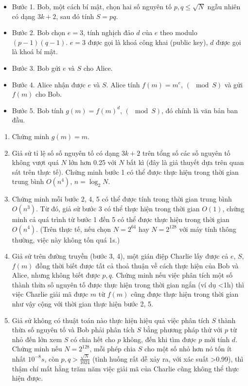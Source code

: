 \documentclass{article}
\begin{document}
\begin{itemize}
    \item Bước 1. Bob, một cách bí mật, chọn hai số nguyên tố $p, q \leq \sqrt{N}$ ngẫu nhiên có dạng $3k + 2$, sau đó tính $S = pq$.
    \item Bước 2. Bob chọn $e=3$, tính nghịch đảo $d$ của $e$ theo modulo $(p-1)(q-1)$. $e=3$ được gọi là khoá công khai (public key), $d$ được gọi là khoá bí mật.
    \item Bước 3. Bob gửi $e$ và $S$ cho Alice.
    \item Bước 4. Alice nhận được $e$ và $S$. Alice tính $f(m) = m^e$, $(\mod S)$ và gửi $f(m)$ cho Bob.
    \item Bước 5. Bob tính $g(m) = f(m)^d$, $(\mod S)$, đó chính là văn bản ban đầu.
\end{itemize}

\begin{em}
    \begin{enumerate}
        \item Chứng minh $g(m) = m$.
        
        \item Giả sử tỉ lệ số số nguyên tố có dạng $3k+2$ trên tổng số các số nguyên tố không vượt quá $N$ lớn hơn 0.25 với $N$ bất kì (đây là giả thuyết dựa trên quan sát trên thực tế). Chứng minh bước 1 có thể được thực hiện trong thời gian trung bình $O(n^4)$, $n = \log_2 N$.
        
        \item Chứng minh mỗi bước 2, 4, 5 có thể được tính trong thời gian trung bình $O(n^3).$ Từ đó, giả sử bước 3 có thể thực hiện trong thời gian $O(1)$, chứng minh cả quá trình từ bước 1 đến 5 có thể được thực hiện trong thời gian $O(n^4)$. (Trên thực tế, nếu chọn $N = 2^{64}$ hay $N=2^{128}$ với máy tính thông thường, việc này không tốn quá 1s.)
        
        \item Giả sử trên đường truyền (bước 3, 4), một gián điệp Charlie lấy được cả $e$, $S$, $f(m)$ đồng thời biết được tất cả thoả thuận về cách thực hiện của Bob và Alice, nhưng không biết được $p, q$. Chứng minh nếu việc phân tích một số thành thừa số nguyên tố được thực hiện trong thời gian ngắn (ví dụ <1h) thì việc Charlie giải mã được $m$ từ $f(m)$ cũng được thực hiện trong thời gian như vậy cộng với thời gian thực hiện bước 2, 5.
        
        \item Giả sử không có thuật toán nào thực hiện hiệu quả việc phân tích $S$ thành thừa số nguyên tố và Bob phải phân tích $S$ bằng phương pháp thử với $p$ từ nhỏ đến lớn xem $S$ có chia hết cho $p$ không, đến khi tìm được $p$ mới tính $d$. Chứng minh nếu $N = 2^{128}$, mỗi phép chia $S$ cho một số nhỏ hơn nó tốn ít nhất $10^{-8}s$, còn $p,q > \frac{\sqrt{N}}{1024}$ (tình huống rất dễ xảy ra, với xác suất >0.99), thì thậm chí mất hằng trăm năm việc giải mã của Charlie cũng không thể thực hiện được.
        
    \end{enumerate}
\end{em}
\end{document}
